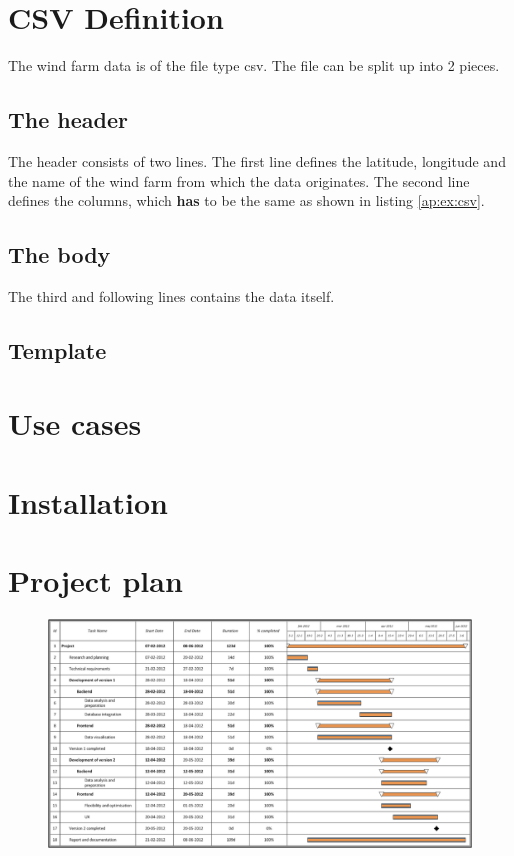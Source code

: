 \chapter{CSV Definition}
\label{ap:csv}
The wind farm data is of the file type csv. The file can be split up into 2 pieces.
\section{The header}
The header consists of two lines. The first line defines the latitude, longitude and the name of the wind farm from which the data originates.
The second line defines the columns, which \textbf{has} to be the same as shown in listing \ref{ap:ex:csv}.

\section{The body}
The third and following lines contains the data itself.

\section{Template}


\chapter{Use cases}
\label{ap:usecase}


\chapter{Installation}
\label{ap:installation}


\chapter{Project plan}
\label{ap:project_plan}
\begin{figure}[htbp]
   \centering
   \includegraphics[height=.65\linewidth,angle=90]{figure/planning2.eps}
\end{figure}